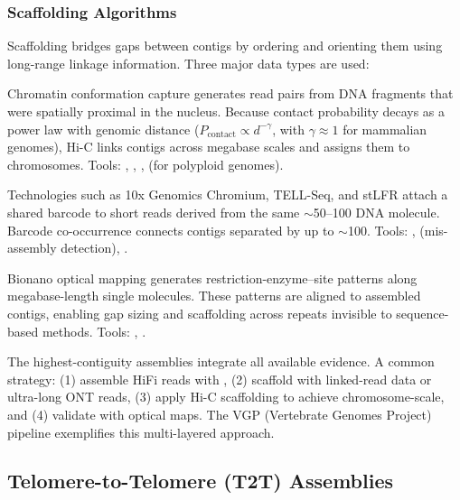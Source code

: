 \subsubsection{Scaffolding Algorithms}
\label{subsubsec:genomeseq:scaffolding}

Scaffolding bridges gaps between contigs by ordering and orienting them using long-range linkage information. Three major data types are used:

\begin{description}[style=nextline]
  \item[Hi-C] Chromatin conformation capture generates read pairs from DNA fragments that were spatially proximal in the nucleus. Because contact probability decays as a power law with genomic distance ($P_{\text{contact}} \propto d^{-\gamma}$, with $\gamma \approx 1$ for mammalian genomes), Hi-C links contigs across megabase scales and assigns them to chromosomes. Tools: , , ,  (for polyploid genomes).
  \item[Linked reads] Technologies such as 10x Genomics Chromium, TELL-Seq, and stLFR attach a shared barcode to short reads derived from the same $\sim$50--100\kilobase{} DNA molecule. Barcode co-occurrence connects contigs separated by up to $\sim$100\kilobase{}. Tools: ,  (mis-assembly detection), .
  \item[Optical maps] Bionano optical mapping generates restriction-enzyme--site patterns along megabase-length single molecules. These patterns are aligned to assembled contigs, enabling gap sizing and scaffolding across repeats invisible to sequence-based methods. Tools: , .
\end{description}

\begin{tipbox}[title={Combining Multiple Scaffolding Data Types}]
The highest-contiguity assemblies integrate all available evidence. A common strategy: (1) assemble HiFi reads with , (2) scaffold with linked-read data or ultra-long ONT reads, (3) apply Hi-C scaffolding to achieve chromosome-scale, and (4) validate with optical maps. The VGP (Vertebrate Genomes Project) pipeline exemplifies this multi-layered approach.
\end{tipbox}

\subsection{Telomere-to-Telomere (T2T) Assemblies}

